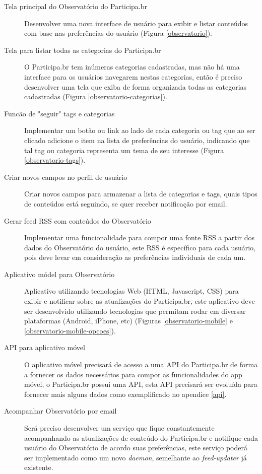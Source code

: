 \documentclass[12pt]{article}
\begin{document}
\begin{description}
  \item[Tela principal do Observatório do Participa.br]{Desenvolver uma nova
    interface de usuário para exibir e listar conteúdos com base nas
    preferências do usuário (Figura \ref{observatorio}).}
  \item[Tela para listar todas as categorias do Participa.br]{O Participa.br
    tem inúmeras categorias cadastradas, mas não há uma interface para os
    usuários navegarem nestas categorias, então é preciso desenvolver uma tela
    que exiba de forma organizada todas as categorias cadastradas (Figura
    \ref{observatorio-categorias}).}
  \item[Funcão de "seguir" tags e categorias]{Implementar um botão ou link ao
    lado de cada categoria ou tag que ao ser clicado adicione o item
    na lista de preferências do usuário, indicando que tal tag ou categoria
    representa um tema de seu interesse (Figura \ref{observatorio-tags}).}
  \item[Criar novos campos no perfil de usuário]{Criar novos campos para
      armazenar a lista de categorias e tags, quais tipos de conteúdos está
      seguindo, se quer receber notificação por email.}
  \item[Gerar feed RSS com conteúdos do Observatório]{Implementar uma
    funcionalidade para compor uma fonte RSS a partir dos dados do
    Observatório do usuário, este RSS é específico para cada usuário, pois deve
    levar em consideração as preferências individuais de cada um.}
  \item[Aplicativo módel para Observatório]{Aplicativo utilizando tecnologias
    Web (HTML, Javascript, CSS) para exibir e notificar sobre as atualizações
    do Participa.br, este aplicativo deve ser desenvolvido utilizando
    tecnologias que permitam rodar em diversar plataformas (Android, iPhone, etc)
    (Figuras \ref{observatorio-mobile} e \ref{observatorio-mobile-opcoes}).}
  \item[API para aplicativo móvel]{O aplicativo móvel precisará de acesso a
    uma API do Participa.br de forma a fornecer os dados necessários para
    compor as funcionalidades do app móvel, o Participa.br possui uma API, esta
    API precisará ser evoluída para fornecer mais alguns dados como exemplificado
    no apendice \ref{api}.}
  \item[Acompanhar Observatório por email]{Será preciso desenvolver um serviço
    que fique constantemente acompanhando as atualizações de conteúdo do
    Participa.br e notifique cada usuário do Observatório de acordo suas
    preferências, este serviço poderá ser implementado como um novo {\it daemon},
    semelhante ao {\it feed-updater} já existente.}
\end{description}
\end{document}
